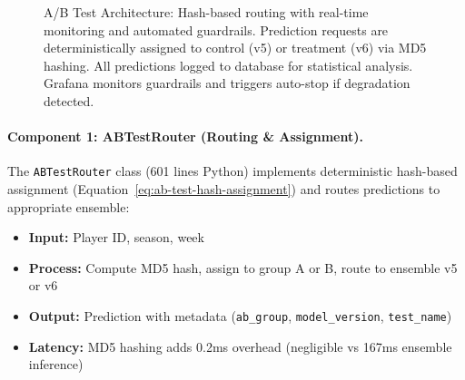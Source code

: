 \begin{figure}[htbp]
\caption{A/B Test Architecture: Hash-based routing with real-time monitoring and automated guardrails. Prediction requests are deterministically assigned to control (v5) or treatment (v6) via MD5 hashing. All predictions logged to database for statistical analysis. Grafana monitors guardrails and triggers auto-stop if degradation detected.}
\label{fig:ab-test-architecture}
\end{figure}

\paragraph{Component 1: ABTestRouter (Routing \& Assignment).}
The \texttt{ABTestRouter} class (601 lines Python) implements deterministic hash-based assignment (Equation~\ref{eq:ab-test-hash-assignment}) and routes predictions to appropriate ensemble:

\begin{itemize}[itemsep=2pt,parsep=0pt]
    \item \textbf{Input:} Player ID, season, week
    \item \textbf{Process:} Compute MD5 hash, assign to group A or B, route to ensemble v5 or v6
    \item \textbf{Output:} Prediction with metadata (\texttt{ab\_group}, \texttt{model\_version}, \texttt{test\_name})
    \item \textbf{Latency:} MD5 hashing adds 0.2ms overhead (negligible vs 167ms ensemble inference)
\end{itemize}

